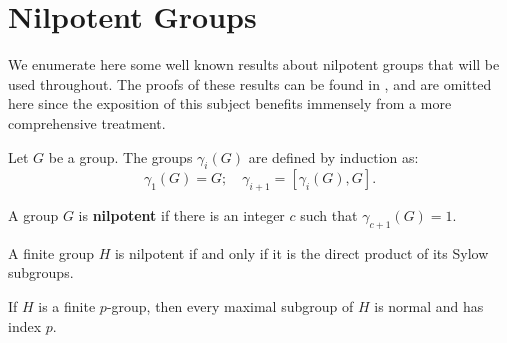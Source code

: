 \pagebreak
\section{Nilpotent Groups}

We enumerate here some well known results about nilpotent groups that will be used throughout. The proofs of these results can be found in \cite{RotmanITG}, and are omitted here since the exposition of this subject benefits immensely from a more comprehensive treatment.

\begin{definition}
    Let $G$ be a group. The groups $\gamma_i(G)$ are defined by induction as:
    $$
    \gamma_1(G) = G; \quad \gamma_{i+1} = \left[\gamma_i(G), G\right].
    $$ 
\end{definition}

\begin{definition}
    A group $G$ is \textbf{nilpotent} if there is an integer $c$ such that $\gamma_{c+1}(G) = 1$. 
\end{definition}

\begin{theorem}
    \cite[p.~116]{RotmanITG}
    A finite group $H$ is nilpotent if and only if it is the direct product of its Sylow subgroups.
\end{theorem}

\begin{theorem}
    \cite[p.~117]{RotmanITG}
    \label{S1NG:maxsub}
    If $H$ is a finite $p$-group, then every maximal subgroup of $H$ is normal and has index $p$.
\end{theorem}

